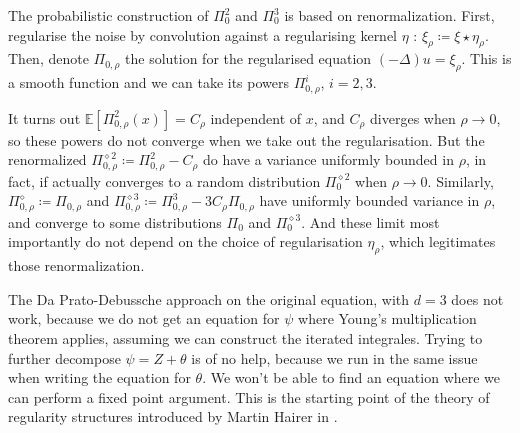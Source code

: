 The probabilistic construction of $\Pi_0^2$ and $\Pi_0^3$ is based on renormalization.
First, regularise the noise by convolution against a regularising kernel $\eta$ : $\xi_\rho \coloneq \xi \star \eta_\rho$. Then, denote $\Pi_{0,\rho}$ the solution for the regularised equation $(-\Delta)u = \xi_\rho$.
This is a smooth function and we can take its powers $\Pi_{0,\rho}^i$, $i=2,3$. 

It turns out $\mathbb{E}\left[ \Pi_{0,\rho}^2 (x) \right] = C_\rho$ independent of $x$, and $C_\rho$ diverges when $\rho \rightarrow 0$, so these powers do not converge when we take out the regularisation.
But  the renormalized $\Pi_{0,\rho}^{\diamond 2} \coloneq \Pi_{0,\rho}^2-C_\rho$ do have a variance uniformly bounded in $\rho$, in fact, if actually converges to a random distribution $\Pi_0^{\diamond 2}$ when $\rho \rightarrow 0$.
Similarly, $\Pi_{0,\rho}^{\diamond} \coloneq \Pi_{0,\rho}$ and $\Pi_{0,\rho}^{\diamond 3} \coloneq \Pi_{0,\rho} ^3 - 3 C_\rho \Pi_{0,\rho}$ have uniformly bounded variance in $\rho$, and converge to some distributions $\Pi_0$ and $\Pi_0^{\diamond 3}$.
And these limit most importantly do not depend on the choice of regularisation $\eta_\rho$, which legitimates those renormalization.

The Da Prato-Debussche approach on the original equation, with $d=3$ does not work, because we do not get an equation for $\psi$ where Young's multiplication theorem applies, assuming we can construct the iterated integrales. 
Trying to further decompose $\psi = Z + \theta$ is of no help, because we run in the same issue when writing the equation for $\theta$.
We won't be able to find an equation where we can perform a fixed point argument. This is the starting point of the theory of regularity structures introduced by Martin Hairer in \cite{Hai14}.




